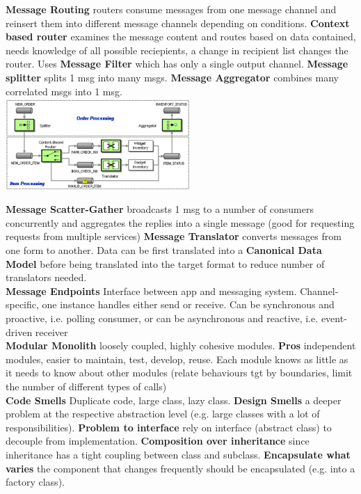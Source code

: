 \documentclass[10pt, landscape]{article}
\begin{document}
\begin{multicols}{4}
\textbf{Message Routing} routers consume messages from one message channel and reinsert them into different message channels depending on conditions. 
\textbf{Context based router} examines the message content and routes based on data contained, needs knowledge of all possible reciepients, a change in recipient list changes the router. Uses \textbf{Message Filter} which has only a single output channel.
\textbf{Message splitter} splits 1 msg into many msgs.
\textbf{Message Aggregator} combines many correlated msgs into 1 msg.\\ 
\includegraphics*[width=7cm]{msg channel.png}

\textbf{Message Scatter-Gather} broadcasts 1 msg to a number of consumers concurrently and aggregates the replies into a single message (good for requesting requests from multiple services)
\textbf{Message Translator} converts messages from one form to another. Data can be first translated into a \textbf{Canonical Data Model} before being translated into the target format to reduce number of translators needed.\\

\textbf{Message Endpoints} Interface between app and messaging system. Channel-specific, one instance handles either send or receive. Can be synchronous and proactive, i.e. polling consumer, or can be asynchronous and reactive, i.e. event-driven receiver \\ 

\textbf{Modular Monolith} loosely coupled, highly cohesive modules. \textbf{Pros} independent modules, easier to  maintain, test, develop, reuse. Each module knows as little as it needs to know about other modules (relate behaviours tgt by boundaries, limit the number of different types of calls)\\

\textbf{Code Smells} Duplicate code, large class, lazy class. \textbf{Design Smells} a deeper problem at the respective abstraction level (e.g. large classes with a lot of responsibilities). \textbf{Problem to interface} rely on interface (abstract class) to decouple from implementation. \textbf{Composition over inheritance} since inheritance has a tight coupling between class and subclass. \textbf{Encapsulate what varies} the component that changes frequently should be encapsulated (e.g. into a factory class).\\


\end{multicols}
\end{document}
